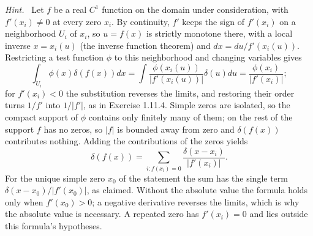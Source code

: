 \emph{Hint.}~
\solution
{}
Let $f$ be a real $C^1$ function on the domain under consideration,
with $f'(x_i)\ne0$ at every zero $x_i$. By continuity, $f'$ keeps the
sign of $f'(x_i)$ on a neighborhood $U_i$ of $x_i$, so $u=f(x)$ is
strictly monotone there, with a local inverse $x=x_i(u)$ (the inverse
function theorem) and $dx=du/f'(x_i(u))$. Restricting a test function
$\phi$ to this neighborhood and changing variables gives
\[
 \int_{U_i}\phi(x)\delta(f(x))dx
 =\int\frac{\phi(x_i(u))}{|f'(x_i(u))|}\delta(u)du
 =\frac{\phi(x_i)}{|f'(x_i)|};
\]
for $f'(x_i)<0$ the substitution reverses the limits, and restoring
their order turns $1/f'$ into $1/|f'|$, as in Exercise 1.11.4.
Simple zeros are isolated, so the compact support of $\phi$ contains
only finitely many of them; on the rest of the support $f$ has no
zeros, so $|f|$ is bounded away from zero and $\delta(f(x))$
contributes nothing. Adding the contributions of the zeros yields
\[
 \boxed{\delta(f(x))=\sum_{i:f(x_i)=0}
                  \frac{\delta(x-x_i)}{|f'(x_i)|}}.
\]
For the unique simple zero $x_0$ of the statement the sum has the
single term $\delta(x-x_0)/|f'(x_0)|$, as claimed. Without the
absolute value the formula holds only when $f'(x_0)>0$; a negative
derivative reverses the limits, which is why the absolute value is
necessary. A repeated zero has $f'(x_i)=0$ and lies outside this
formula's hypotheses.


